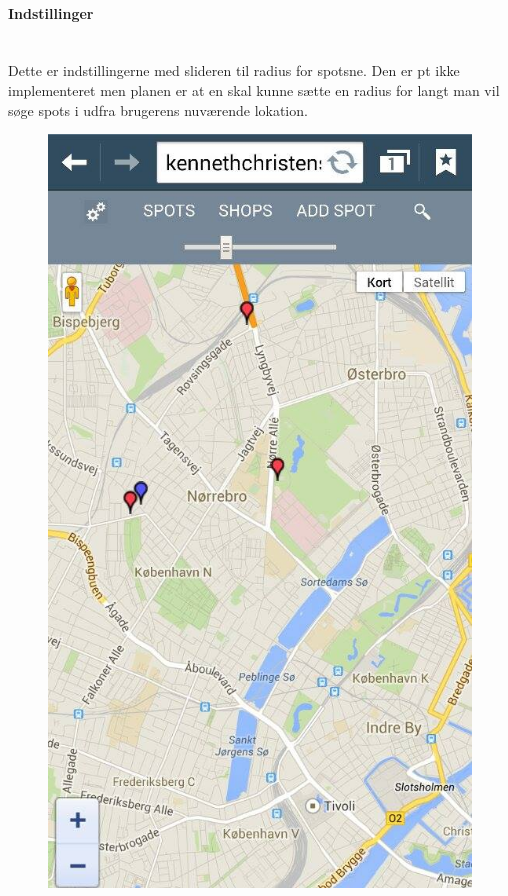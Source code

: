 \documentclass[12pt]{article}
\begin{document}
\newpage
\paragraph{Indstillinger}\mbox{}\\
Dette er indstillingerne med slideren til radius for spotsne. Den er pt ikke implementeret men planen er at en skal kunne sætte en radius for langt man vil søge spots i udfra brugerens nuværende lokation.\\
\begin{figure}[h]
\includegraphics[scale = 0.3]{msettings}
\end{figure}
\end{document}
